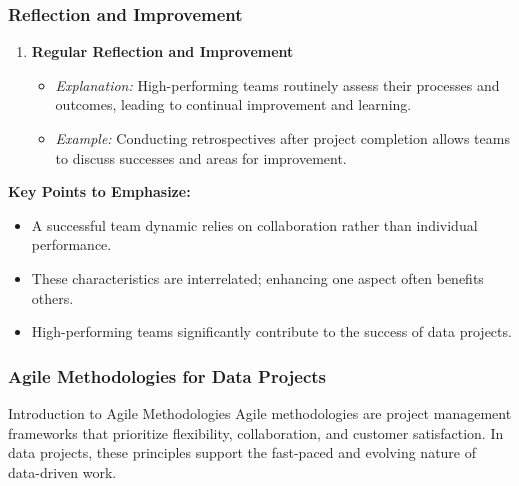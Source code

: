 \documentclass[aspectratio=169]{beamer}
\begin{document}
\begin{frame}[fragile]
    \frametitle{Reflection and Improvement}
    \begin{enumerate}
        \item \textbf{Regular Reflection and Improvement}
        \begin{itemize}
            \item \textit{Explanation:} High-performing teams routinely assess their processes and outcomes, leading to continual improvement and learning.
            \item \textit{Example:} Conducting retrospectives after project completion allows teams to discuss successes and areas for improvement.
        \end{itemize}
    \end{enumerate}
    
    \textbf{Key Points to Emphasize:}
    \begin{itemize}
        \item A successful team dynamic relies on collaboration rather than individual performance.
        \item These characteristics are interrelated; enhancing one aspect often benefits others.
        \item High-performing teams significantly contribute to the success of data projects.
    \end{itemize}
\end{frame}

\begin{frame}[fragile]
    \frametitle{Agile Methodologies for Data Projects}
    \begin{block}{Introduction to Agile Methodologies}
        Agile methodologies are project management frameworks that 
        prioritize flexibility, collaboration, and customer satisfaction. 
        In data projects, these principles support the fast-paced and 
        evolving nature of data-driven work.
    \end{block}
\end{frame}
\end{document}
